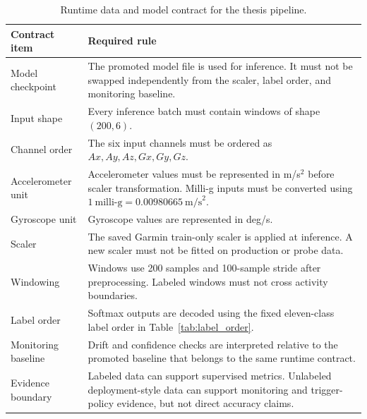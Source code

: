 \renewcommand{\arraystretch}{1.15}
\begin{table}[H]
\centering
\footnotesize
\caption[Runtime data and model contract for the thesis pipeline.]{Runtime data and model contract for the thesis pipeline.}
\label{tab:runtime_contract_summary}
\begin{tabularx}{\textwidth}{p{3.5cm} X}
\toprule
\textbf{Contract item} & \textbf{Required rule} \\
\midrule
Model checkpoint
& The promoted model file is used for inference. It must not be swapped independently from the scaler, label order, and monitoring baseline. \\

Input shape
& Every inference batch must contain windows of shape \((200,6)\). \\

Channel order
& The six input channels must be ordered as \(Ax, Ay, Az, Gx, Gy, Gz\). \\

Accelerometer unit
& Accelerometer values must be represented in m/s$^2$ before scaler transformation. Milli-g inputs must be converted using \(1~\text{milli-g}=0.00980665~\text{m/s}^2\). \\

Gyroscope unit
& Gyroscope values are represented in deg/s. \\

Scaler
& The saved Garmin train-only scaler is applied at inference. A new scaler must not be fitted on production or probe data. \\

Windowing
& Windows use 200 samples and 100-sample stride after preprocessing. Labeled windows must not cross activity boundaries. \\

Label order
& Softmax outputs are decoded using the fixed eleven-class label order in Table~\ref{tab:label_order}. \\

Monitoring baseline
& Drift and confidence checks are interpreted relative to the promoted baseline that belongs to the same runtime contract. \\

Evidence boundary
& Labeled data can support supervised metrics. Unlabeled deployment-style data can support monitoring and trigger-policy evidence, but not direct accuracy claims. \\
\bottomrule
\end{tabularx}
\renewcommand{\arraystretch}{1.0}
\end{table}
\FloatBarrier

